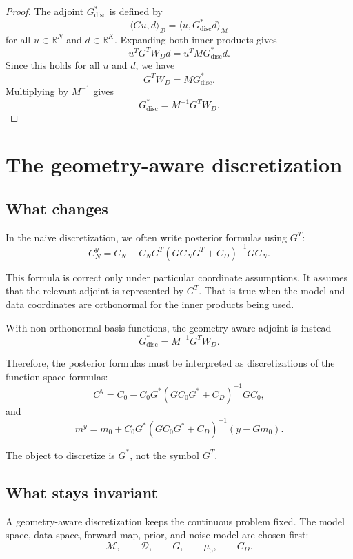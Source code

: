 \documentclass[11pt,a4paper]{book}
\newcommand{\M}{\mathcal{M}}      %
\newcommand{\D}{\mathcal{D}}      %
\newcommand{\R}{\mathbb{R}}
\newcommand{\prior}{\mu_0}
\newcommand{\obs}{y}
\newcommand{\G}{G}
\newcommand{\Gadj}{G^\ast}
\begin{document}
\begin{proof}
The adjoint $G^\ast_{\mathrm{disc}}$ is defined by
\[
    \langle Gu,d\rangle_{\D}
    =
    \langle u,G^\ast_{\mathrm{disc}}d\rangle_{\M}
\]
for all $u\in\R^N$ and $d\in\R^K$. Expanding both inner products gives
\[
    u^T G^T W_D d
    =
    u^T M G^\ast_{\mathrm{disc}} d.
\]
Since this holds for all $u$ and $d$, we have
\[
    G^T W_D
    =
    M G^\ast_{\mathrm{disc}}.
\]
Multiplying by $M^{-1}$ gives
\[
    G^\ast_{\mathrm{disc}}
    =
    M^{-1}G^T W_D.
\]
\end{proof}

\section{The geometry-aware discretization}

\subsection{What changes}

In the naive discretization, we often write posterior formulas using $G^T$:
\[
    C_N^y
    =
    C_N
    -
    C_N G^T
    \left(
        G C_N G^T + C_D
    \right)^{-1}
    G C_N.
\]

This formula is correct only under particular coordinate assumptions. It assumes
that the relevant adjoint is represented by $G^T$. That is true when the model
and data coordinates are orthonormal for the inner products being used.

With non-orthonormal basis functions, the geometry-aware adjoint is instead
\[
    G^\ast_{\mathrm{disc}}
    =
    M^{-1}G^T W_D.
\]

Therefore, the posterior formulas must be interpreted as discretizations of the
function-space formulas:
\[
    C^y
    =
    C_0
    -
    C_0\Gadj
    \left(
        \G C_0\Gadj + C_D
    \right)^{-1}
    \G C_0,
\]
and
\[
    m^y
    =
    m_0
    +
    C_0\Gadj
    \left(
        \G C_0\Gadj + C_D
    \right)^{-1}
    (\obs-\G m_0).
\]

The object to discretize is $\Gadj$, not the symbol $G^T$.

\subsection{What stays invariant}

A geometry-aware discretization keeps the continuous problem fixed. The model
space, data space, forward map, prior, and noise model are chosen first:
\[
    \M,
    \qquad
    \D,
    \qquad
    \G,
    \qquad
    \prior,
    \qquad
    C_D.
\]
\end{document}
